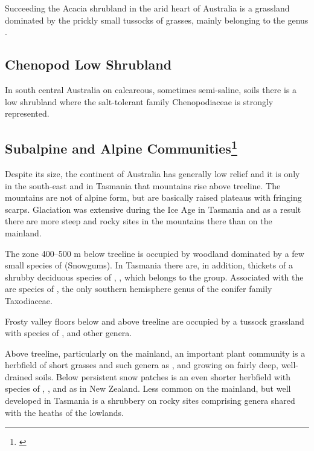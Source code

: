 Succeeding the Acacia shrubland in the arid heart of Australia is a grassland dominated by the prickly small tussocks of grasses, mainly belonging to the genus .

\subsection{Chenopod Low Shrubland}

In south central Australia on calcareous, sometimes semi-saline, soils there is a low shrubland where the salt-tolerant family Chenopodiaceae is strongly represented.

\subsection[Subalpine and Alpine Communities]{Subalpine and Alpine Communities\footnote{\cite{harris1970alpine}}}

Despite its size, the continent of Australia has generally low relief and it is only in the south-east and in Tasmania that mountains rise above treeline.
The mountains are not of alpine form, but are basically raised plateaus with fringing scarps.
Glaciation was extensive during the Ice Age in Tasmania and as a result there are more steep and rocky sites in the mountains there than on the mainland.

The zone 400–500 m below treeline is occupied by woodland dominated by a few small species of  (Snowgums).
In Tasmania there are, in addition, thickets of a shrubby deciduous species of , , which belongs to the  group.
Associated with the  are species of , the only southern hemisphere genus of the conifer family Taxodiaceae.

Frosty valley floors below and above treeline are occupied by a tussock grassland with species of ,  and other genera.

Above treeline, particularly on the mainland, an important plant community is a herbfield of short grasses and such genera as ,  and  growing on fairly deep, well-drained soils.
Below persistent snow patches is an even shorter herbfield with species of , ,  and  as in New Zealand.
Less common on the mainland, but well developed in Tasmania is a shrubbery on rocky sites comprising genera shared with the heaths of the lowlands.

